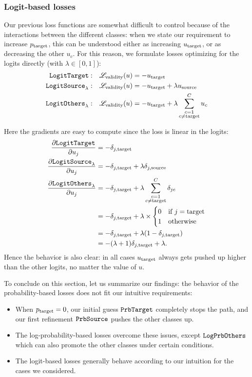 \documentclass[../main.tex]{subfiles}
\begin{document}
\subsubsection{Logit-based losses}

Our previous loss functions are somewhat difficult to control because of the interactions between the different classes:
when we state our requirement to increase $p_{\mathrm{target}}$, this can be understood either as increasing $u_{\mathrm{target}}$, or as decreasing the other $u_c$.
For this reason, we formulate losses optimizing for the logits directly (with $\lambda \in [0, 1]$):
\begin{align*}
    \mathtt{LogitTarget}{}:        & \quad    \mathscr{L}_\text{validity}(u) = - u_{\mathrm{target}}                         \\
    \mathtt{LogitSource}_{\lambda}: & \quad     \mathscr{L}_\text{validity}(u) = - u_{\mathrm{target}} + \lambda u_{\mathrm{source}}    \\
    \mathtt{LogitOthers}_{\lambda}: & \quad    \mathscr{L}_\text{validity}(u) = - u_{\mathrm{target}} + \lambda \sum_{\substack{{c}=1 \\ {c} \neq \mathrm{target}}}^C u_c
\end{align*}

Here the gradients are easy to compute since the loss is linear in the logits:
\begin{align*}
\frac{\partial \mathtt{LogitTarget}{}}{\partial u_j} &= - \delta_{j, \mathrm{target}}                         \\
\frac{\partial \mathtt{LogitSource}_{\lambda}}{\partial u_j} &= - \delta_{j, \mathrm{target}} + \lambda \delta_{j, \mathrm{source}}                        \\
\frac{\partial \mathtt{LogitOthers}_{\lambda}}{\partial u_j}
&= - \delta_{j, \mathrm{target}} + \lambda \sum_{\substack{{c}=1 \\ {c} \neq \mathrm{target}}}^C \delta_{jc} \\
&= - \delta_{j, \mathrm{target}} + \lambda \times \begin{cases}
    0 & \text{if } j = \mathrm{target} \\
    1 & \text{otherwise} 
\end{cases} \\
&= - \delta_{j, \mathrm{target}} + \lambda (1 - \delta_{j, \mathrm{target}}) \\
&= -(\lambda + 1)\delta_{j, \mathrm{target}} + \lambda.
\end{align*}
Hence the behavior is also clear: in all cases $u_{\mathrm{target}}$ always gets pushed up higher than the other logits, no matter the value of $u$.

To conclude on this section, let us summarize our findings:
the behavior of the probability-based losses does not fit our intuitive requirements:
\begin{itemize}
    \item When $p_{\mathrm{target}} = 0$, our initial guess $\mathtt{PrbTarget}$ completely stops the path, and our first
    refinement $\mathtt{PrbSource}_{}$ pushes the other classes up.
    \item The log-probability-based losses overcome these issues, except $\mathtt{LogPrbOthers}_{}$ which can also
    promote the other classes under certain conditions.
    \item The logit-based losses generally behave according to our intuition for the cases we considered.
\end{itemize}
\end{document}
